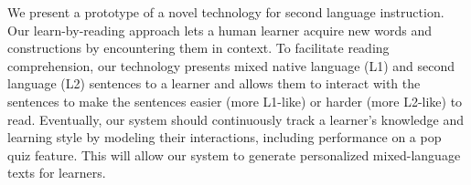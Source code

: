 We present a prototype of a novel technology for second language instruction. Our learn-by-reading approach lets a human learner acquire new words and constructions by encountering them in context. To facilitate reading comprehension, our technology presents mixed native language (L1) and second language (L2) sentences to a learner and allows them to interact with the sentences to make the sentences easier (more L1-like) or harder (more L2-like) to read. Eventually, our system should continuously track a learner's knowledge and learning style by modeling their interactions, including performance on a pop quiz feature. This will allow our system to generate personalized mixed-language texts for learners.
